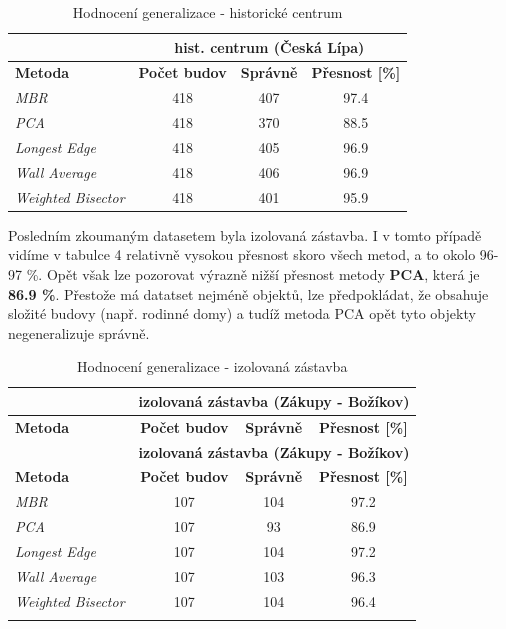 \documentclass[12pt, a4paper]{article}
\begin{document}
\begin{table}[H]
    \centering
    \begin{small}
    \begin{tabular}{|l|c|c|c|}
        \hline
        & \multicolumn{3}{c|}{\textbf{hist. centrum (Česká Lípa)}} \\
        \hline
        \textbf{Metoda} & \textbf{Počet budov} & \textbf{Správně} & \textbf{Přesnost [\%]} \\
        \hline
        \textit{MBR} & 418 & 407 & 97.4 \\
        \hline
        \textit{PCA} & 418 & 370 & 88.5 \\
        \hline
        \textit{Longest Edge} & 418 & 405 & 96.9 \\
        \hline
        \textit{Wall Average} & 418 & 406 & 96.9 \\
        \hline
        \textit{Weighted Bisector} & 418 & 401 & 95.9 \\
        \hline
    \end{tabular}
    \end{small}
    \caption{Hodnocení generalizace - historické centrum}
\end{table}

Posledním zkoumaným datasetem byla izolovaná zástavba. I v tomto případě vidíme v tabulce 4 relativně vysokou přesnost skoro všech metod, a to okolo 96-97 \%. Opět však lze pozorovat výrazně nižší přesnost metody \textbf{PCA}, která je \textbf{86.9 \%}. Přestože má datatset nejméně objektů, lze předpokládat, že obsahuje složité budovy (např. rodinné domy) a tudíž metoda PCA opět tyto objekty negeneralizuje správně.

\begin{small}
\begin{longtable}{|l|c|c|c|}
    \hline
    & \multicolumn{3}{c|}{\textbf{izolovaná zástavba (Zákupy - Božíkov)}} \\
    \hline
    \textbf{Metoda} & \textbf{Počet budov} & \textbf{Správně} & \textbf{Přesnost [\%]} \\
    \hline
    \endfirsthead
    
    \hline
    & \multicolumn{3}{c|}{\textbf{izolovaná zástavba (Zákupy - Božíkov)}} \\
    \hline
    \textbf{Metoda} & \textbf{Počet budov} & \textbf{Správně} & \textbf{Přesnost [\%]} \\
    \hline
    \endhead

    \textit{MBR} & 107 & 104 & 97.2 \\
    \hline
    \textit{PCA} & 107 & 93 & 86.9 \\
    \hline
    \textit{Longest Edge} & 107 & 104 & 97.2 \\
    \hline
    \textit{Wall Average} & 107 & 103 & 96.3 \\
    \hline
    \textit{Weighted Bisector} & 107 & 104 & 96.4 \\
    \hline
    \caption{Hodnocení generalizace - izolovaná zástavba}
    
\end{longtable}
\end{small}
\end{document}
